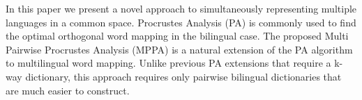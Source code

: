In this paper we present a novel approach to simultaneously representing multiple languages
in a common space. Procrustes Analysis (PA) is commonly used to find the optimal orthogonal word mapping in the bilingual case. The proposed Multi Pairwise Procrustes Analysis (MPPA) is a natural extension of the PA algorithm  to multilingual word mapping. Unlike previous PA extensions that require a k-way dictionary, this approach requires only pairwise bilingual dictionaries that are much easier to construct.